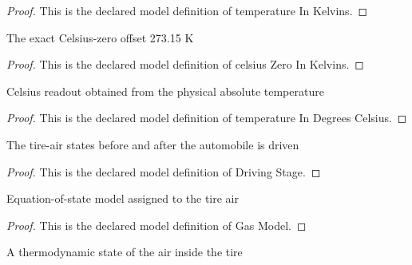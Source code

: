 \begin{proof}
  This is the declared model definition of temperature In Kelvins.
\end{proof}
\begin{definition}
  \label{def:physics:phyx-mini-0399:phyxminiproblems-problemphyxmini0399-celsiuszeroinkelvins}
  The exact Celsius-zero offset 273.15 K
\end{definition}
\begin{proof}
  This is the declared model definition of celsius Zero In Kelvins.
\end{proof}
\begin{definition}
  \label{def:physics:phyx-mini-0399:phyxminiproblems-problemphyxmini0399-temperatureindegreescelsius}
  Celsius readout obtained from the physical absolute temperature
\end{definition}
\begin{proof}
  This is the declared model definition of temperature In Degrees Celsius.
\end{proof}
\begin{definition}
  \label{def:physics:phyx-mini-0399:phyxminiproblems-problemphyxmini0399-drivingstage}
  The tire-air states before and after the automobile is driven
\end{definition}
\begin{proof}
  This is the declared model definition of Driving Stage.
\end{proof}
\begin{definition}
  \label{def:physics:phyx-mini-0399:phyxminiproblems-problemphyxmini0399-gasmodel}
  Equation-of-state model assigned to the tire air
\end{definition}
\begin{proof}
  This is the declared model definition of Gas Model.
\end{proof}
\begin{definition}
  \label{def:physics:phyx-mini-0399:phyxminiproblems-problemphyxmini0399-tireairstate}
  A thermodynamic state of the air inside the tire
\end{definition}
